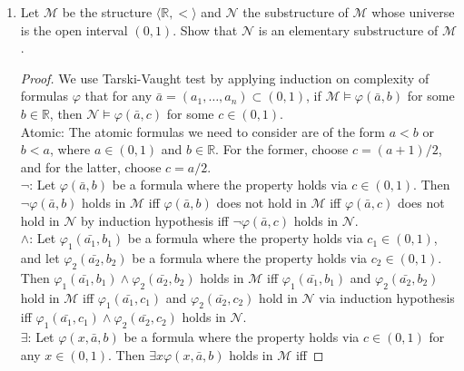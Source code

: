 \documentclass{article}
\begin{document}
\begin{enumerate}
\begin{enumerate}
\begin{proof}
          For each $n\in\mathbb{N}\setminus\{0,1\}$, $S_n$ is unique,
          hence we have infinitely many minimal definable and infinite
          subsets $S_n$.
        \end{proof}
    \end{enumerate}

  \item Let $\mathcal{M}$ be the structure
    $\langle\mathbb{R},<\rangle$ and $\mathcal{N}$ the substructure of
    $\mathcal{M}$ whose universe is the open interval $(0,1)$. Show
    that $\mathcal{N}$ is an elementary substructure of $\mathcal{M}$.

    \begin{proof}
      We use Tarski-Vaught test by applying induction on complexity of
      formulas $\varphi$ that for any
      $\bar{a}=(a_1,\ldots,a_n)\subset(0,1)$, if
      $\mathcal{M}\models\varphi(\bar{a},b)$ for some $b\in\mathbb{R}$,
      then $\mathcal{N}\models\varphi(\bar{a},c)$ for some $c\in(0,1)$. \\

      Atomic: The atomic formulas we need to consider are of the
      form $a<b$ or $b<a$, where $a\in(0,1)$ and $b\in\mathbb{R}$. For the
      former, choose $c=(a+1)/2$, and for the latter, choose $c=a/2$. \\

      $\neg$: Let $\varphi(\bar{a},b)$ be a formula where the property
      holds via $c\in(0,1)$. Then $\neg\varphi(\bar{a},b)$ holds in
      $\mathcal{M}$ iff $\varphi(\bar{a},b)$ does not hold in $\mathcal{M}$
      iff $\varphi(\bar{a},c)$ does not hold in $\mathcal{N}$ by induction
      hypothesis iff $\neg\varphi(\bar{a},c)$ holds in $\mathcal{N}$. \\

      $\wedge$: Let $\varphi_1(\bar{a_1},b_1)$ be a formula where the
      property holds via $c_1\in(0,1)$, and let $\varphi_2(\bar{a_2},b_2)$
      be a formula where the property holds via $c_2\in(0,1)$. Then
      $\varphi_1(\bar{a_1},b_1)\wedge\varphi_2(\bar{a_2},b_2)$ holds in
      $\mathcal{M}$ iff $\varphi_1(\bar{a_1},b_1)$ and
      $\varphi_2(\bar{a_2},b_2)$ hold in $\mathcal{M}$ iff
      $\varphi_1(\bar{a_1},c_1)$ and $\varphi_2(\bar{a_2},c_2)$ hold in
      $\mathcal{N}$ via induction hypothesis iff
      $\varphi_1(\bar{a_1},c_1)\wedge\varphi_2(\bar{a_2},c_2)$ holds in
      $\mathcal{N}$. \\

      $\exists$: Let $\varphi(x,\bar{a},b)$ be a formula where the property
      holds via $c\in(0,1)$ for any $x\in(0,1)$. Then $\exists
      x\varphi(x,\bar{a},b)$ holds in $\mathcal{M}$ iff
    \end{proof}


\end{enumerate}
\end{document}
